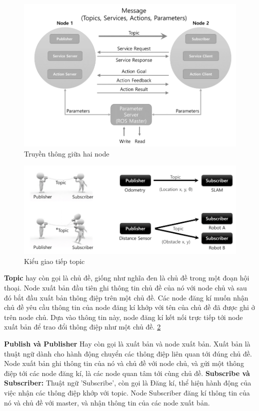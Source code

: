 {\begin{figure}[htbp]
  \centering
  \includegraphics[width=0.8\linewidth]{figures/messageCommunication.png}
  \caption{Truyền thông giữa hai node}
  \label{fig:messageCommunication}
\end{figure}

\begin{figure}[htbp]
  \centering
  \includegraphics[width=0.9\linewidth]{figures/topic.png}
  \caption{Kiểu giao tiếp topic}
  \label{fig:topic}
\end{figure}

\textbf{Topic} hay còn gọi là chủ đề, giống như nghĩa đen là chủ đề trong một đoạn hội thoại. Node xuất bản đầu tiên ghi thông tin chủ đề của nó với node chủ và sau đó bắt đầu xuất bản thông điệp trên một chủ đề. Các node đăng kí muốn nhận chủ đề yêu cầu thông tin của node đăng kí khớp với tên của chủ đề đã được ghi ở trên node chủ. Dựa vào thông tin này, node đăng kí kết nối trực tiếp tới node xuất bản để trao đổi thông điệp như một chủ đề. \figurename{ \ref{fig:topic}}

\textbf{Publish và Publisher} Hay còn gọi là xuất bản và node xuất bản. Xuất bản là thuật ngữ dành cho hành động chuyển các thông điệp liên quan tới đúng chủ đề. Node xuất bản ghi thông tin của nó và chủ đề với node chủ, và gửi một thông điệp tới các node đăng kí, là các node quan tâm tới cùng chủ đề.
\textbf{Subscribe và Subscriber:} Thuật ngữ 'Subscribe', còn gọi là Đăng kí, thể hiện hành động của việc nhận các thông điệp khớp với topic. Node Subscriber đăng kí thông tin của nó và chủ đề với master, và nhận thông tin của các node xuất bản.

}
